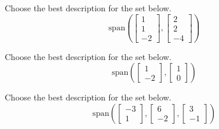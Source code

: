 \documentclass{ximera}
\begin{document}
  \begin{problem}\label{prob:describespan1}
  Choose the best description for the set below.
  $$\mbox{span}\left(\begin{bmatrix}1\\1\\-2\end{bmatrix}, \begin{bmatrix}2\\2\\-4\end{bmatrix}\right)$$
  
  \begin{multipleChoice}
 \end{multipleChoice}
  \end{problem}
  
  \begin{problem}\label{prob:describespan2}
  Choose the best description for the set below.
  $$\mbox{span}\left(\begin{bmatrix}1\\-2\end{bmatrix}, \begin{bmatrix}1\\0\end{bmatrix}\right)$$
  
   \begin{multipleChoice}
  \end{multipleChoice}
  \end{problem}
  
  \begin{problem}\label{prob:describespan3}
  Choose the best description for the set below.
  $$\mbox{span}\left(\begin{bmatrix}-3\\1\end{bmatrix}, \begin{bmatrix}6\\-2\end{bmatrix}, \begin{bmatrix}3\\-1\end{bmatrix}\right)$$
  
  \begin{multipleChoice}
\end{multipleChoice}
  \end{problem}
\end{document}
